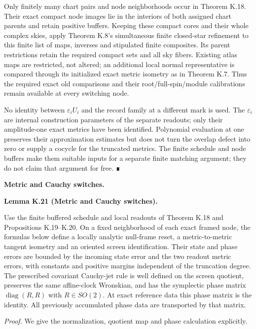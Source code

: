 \documentclass[
  english,
  11pt,
  reqno]{amsart}
\makeatletter
\newcommand{\pandocstatementheading}[1]{%
  \par\addpenalty{\@beginparpenalty}%
  \addvspace{.5\baselineskip plus .2\baselineskip minus .2\baselineskip}%
  {\normalfont\bfseries #1\par}%
  \nobreak\@afterindenttrue\@afterheading
}
\makeatother
\begin{document}
Only finitely many chart pairs and node neighborhoods occur in Theorem
K.18. Their exact compact node images lie in the interiors of both
assigned chart parents and retain positive buffers. Keeping these
compact cores and their whole complex skies, apply Theorem K.8's
simultaneous finite closed-star refinement to this finite list of maps,
inverses and stipulated finite composites. Its parent restrictions
retain the required compact sets and all sky fibers. Existing atlas maps
are restricted, not altered; an additional local normal representative
is compared through its initialized exact metric isometry as in Theorem
K.7. Thus the required exact old comparisons and their
root/full-spin/module calibrations remain available at every switching
node.

No identity between \(\varepsilon_iU_i\) and the record family at a
different mark is used. The \(\varepsilon_i\) are internal construction
parameters of the separate readouts; only their amplitude-one exact
metrics have been identified. Polynomial evaluation at one preserves
their approximation estimates but does not turn the overlap defect into
zero or supply a cocycle for the truncated metrics. The finite schedule
and node buffers make them suitable inputs for a separate finite
matching argument; they do not claim that argument for free. ∎

\protect{}\label{sec:fro-b-switches}

\textbf{Metric and Cauchy switches.}

\pandocstatementheading{\protect{}\label{lem:fro-b-cauchy-switch}Lemma K.21 (Metric and Cauchy switches).}

Use the finite buffered schedule and local readouts of Theorem K.18 and
Propositions K.19--K.20. On a fixed neighborhood of each exact framed
node, the formulas below define a locally analytic null-frame reset, a
metric-to-metric tangent isometry and an oriented screen identification.
Their state and phase errors are bounded by the incoming state error and
the two readout metric errors, with constants and positive margins
independent of the truncation degree. The prescribed covariant
Cauchy-jet rule is well defined on the screen quotient, preserves the
same affine-clock Wronskian, and has the symplectic phase matrix
\(\operatorname{diag}(R,R)\) with \(R\in SO(2)\). At exact reference
data this phase matrix is the identity. All previously accumulated phase
data are transported by that matrix.

\emph{Proof.} We give the normalization, quotient map and phase
calculation explicitly.
\end{document}
